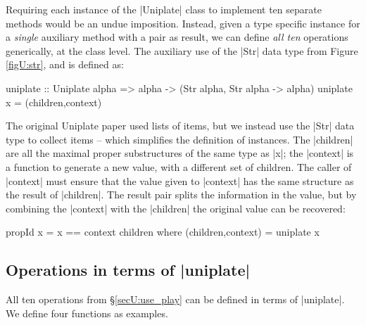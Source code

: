Requiring each instance of the |Uniplate| class to implement ten separate methods would be an undue imposition. Instead, given a type specific instance for a \textit{single} auxiliary method with a pair as result, we can define \textit{all ten} operations generically, at the class level. The auxiliary use of the |Str| data type from Figure \ref{figU:str}, and is defined as:

\begin{code}
uniplate :: Uniplate alpha => alpha -> (Str alpha, Str alpha -> alpha)
uniplate x = (children,context)
\end{code}

The original Uniplate paper \cite{me:uniplate} used lists of items, but we instead use the |Str| data type to collect items -- which simplifies the definition of instances. The |children| are all the maximal proper substructures of the same type as |x|; the |context| is a function to generate a new value, with a different set of children. The caller of |context| must ensure that the value given to |context| has the same structure as the result of |children|. The result pair splits the information in the value, but by combining the |context| with the |children| the original value can be recovered:

\begin{code}
propId x = x == context children
    where (children,context) = uniplate x
\end{code}

\subsection{Operations in terms of |uniplate|}
\label{secU:using_replacechildren}

All ten operations from \S\ref{secU:use_play} can be defined in terms of |uniplate|. We define four functions as examples.


